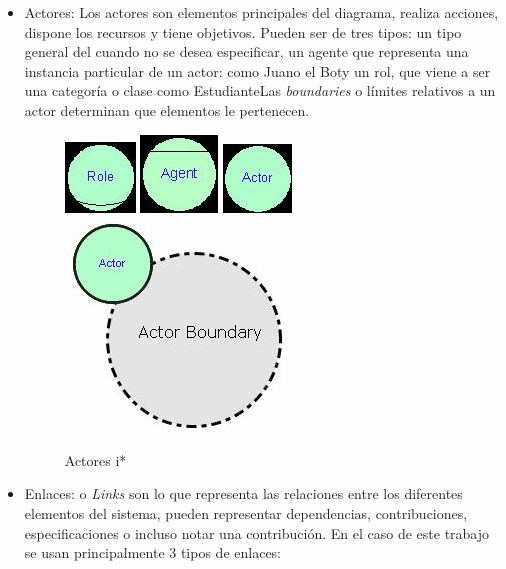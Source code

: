 \begin{itemize}
        \item Actores: Los actores son elementos principales del diagrama, realiza acciones, dispone los recursos y tiene objetivos. Pueden ser de tres tipos: un tipo general del cuando no se desea especificar, un agente que representa una instancia particular de un actor: como \guillemotleft Juan\guillemotleft o el \guillemotleft Bot\guillemotleft y un rol, que viene a ser una categoría o clase como \guillemotleft Estudiante\guillemotleft  Las \textit{boundaries} o límites relativos a un actor determinan que elementos le \guillemotleft pertenecen\guillemotleft.
        \begin{figure}[h!]
            \centering
            \includegraphics[scale=0.4]{media/imagenes/i_star/sintaxis/role.jpg}
            \includegraphics[scale=0.4]{media/imagenes/i_star/sintaxis/agent.jpg}
            \includegraphics[scale=0.4]{media/imagenes/i_star/sintaxis/actor.jpg}
            \includegraphics[scale=0.4]{media/imagenes/i_star/sintaxis/actorboundary.jpg}
            \caption{Actores \gls{i*}}
        \end{figure}
        \item Enlaces: o \textit{Links} son lo que representa las relaciones entre los diferentes elementos del sistema, pueden representar dependencias, contribuciones, especificaciones o incluso notar una contribución. En el caso de este trabajo se usan principalmente 3 tipos de enlaces:

\end{itemize}
